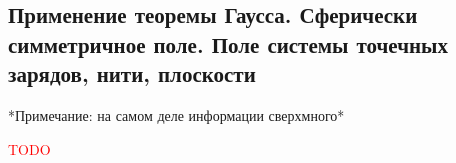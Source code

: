 \subsection{Применение теоремы Гаусса. Сферически симметричное поле. Поле системы точечных зарядов, нити, плоскости}

*Примечание: на самом деле информации сверхмного*

\textcolor{red}{\centering \huge TODO}